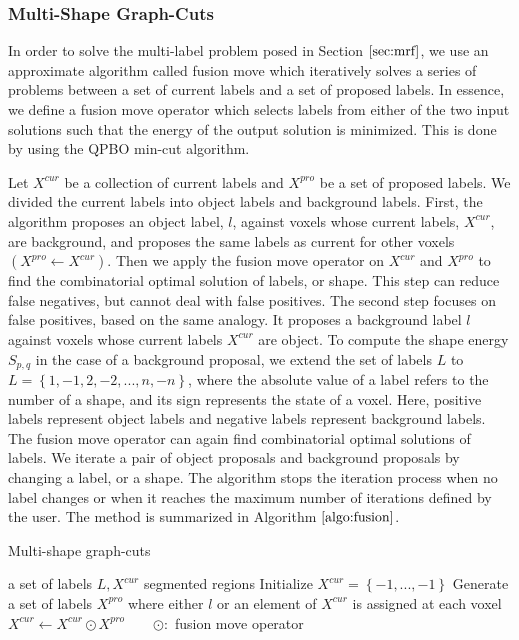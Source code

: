 \documentclass{SMBV12}
\begin{document}
\subsubsection{Multi-Shape Graph-Cuts}
In order to solve the multi-label problem posed in Section $\ref{sec:mrf}$, we use an approximate algorithm called fusion move \cite{lempitsky2010fusion} which iteratively solves a series of problems between a set of current labels and a set of proposed labels. In essence, we define a fusion move operator which selects labels from either of the two input solutions such that the energy of the output solution is minimized. This is done by using the QPBO min-cut algorithm.

Let $X^{cur}$ be a collection of current labels and $X^{pro}$ be a set of proposed labels. We divided the current labels into object labels and background labels. First, the algorithm proposes an object label, $l$, against voxels whose current labels, $X^{cur}$, are background, and proposes the same labels as current for other voxels $(X^{pro} \leftarrow X^{cur})$. Then we apply the fusion move operator on $X^{cur}$ and $X^{pro}$ to find the combinatorial optimal solution of labels, or shape. This step can reduce false negatives, but cannot deal with false positives. The second step focuses on false positives, based on the same analogy. It proposes a background label $l$ against voxels whose current labels $X^{cur}$ are object. To compute the shape energy $S_{p,q}$ in the case of a background proposal, we extend the set of labels $L$ to $L = \left\lbrace 1, -1, 2, -2, ..., n, -n \right\rbrace$, where the absolute value of a label refers to the number of a shape, and its sign represents the state of a voxel. Here, positive labels represent object labels and negative labels represent background labels. The fusion move operator can again find combinatorial optimal solutions of labels. We iterate a pair of object proposals and background proposals by changing a label, or a shape. The algorithm stops the iteration process when no label changes or when it reaches the maximum number of iterations defined by the user. The method is summarized in Algorithm $\ref{algo:fusion}$.

\begin{algorithm}
\caption{Multi-shape graph-cuts}
\label{algo:fusion}
\begin{algorithmic}
\Require a set of labels $L, X^{cur}$
\Ensure segmented regions
\State Initialize $X^{cur} = \left\lbrace -1, ..., -1\right\rbrace $
\Repeat
		\State Generate a set of labels $X^{pro}$ where either $l$ or an element of $X^{cur}$ is assigned at each voxel
		\State $X^{cur} \leftarrow X^{cur} \odot X^{pro} \qquad \odot:$ fusion move operator \cite{lempitsky2010fusion}
	\EndFor 
{}
\end{algorithmic}
\end{algorithm}
\end{document}
